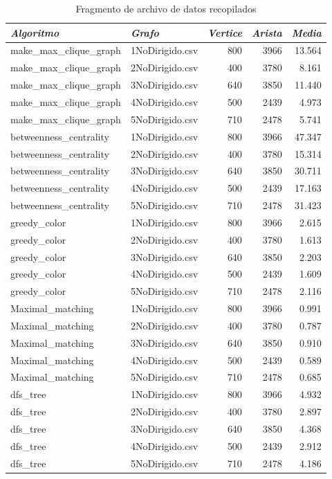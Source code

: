 \documentclass{article}
\begin{document}
\begin{table}[htbp]
  \centering
  \caption{Fragmento de archivo de datos recopilados}
    \begin{tabular}{llrrr}
    \toprule
    \textit{\textbf{Algoritmo}} & \textit{\textbf{Grafo}} & \multicolumn{1}{l}{\textit{\textbf{Vertice}}} & \multicolumn{1}{l}{\textit{\textbf{Arista}}} & \multicolumn{1}{l}{\textit{\textbf{Media}}} \\
    \midrule
    make\_max\_clique\_graph & 1NoDirigido.csv & 800   & 3966  & 13.564 \\
    make\_max\_clique\_graph & 2NoDirigido.csv & 400   & 3780  & 8.161 \\
    make\_max\_clique\_graph & 3NoDirigido.csv & 640   & 3850  & 11.440 \\
    make\_max\_clique\_graph & 4NoDirigido.csv & 500   & 2439  & 4.973 \\
    make\_max\_clique\_graph & 5NoDirigido.csv & 710   & 2478  & 5.741 \\
    betweenness\_centrality & 1NoDirigido.csv & 800   & 3966  & 47.347 \\
    betweenness\_centrality & 2NoDirigido.csv & 400   & 3780  & 15.314 \\
    betweenness\_centrality & 3NoDirigido.csv & 640   & 3850  & 30.711 \\
    betweenness\_centrality & 4NoDirigido.csv & 500   & 2439  & 17.163 \\
    betweenness\_centrality & 5NoDirigido.csv & 710   & 2478  & 31.423 \\
    greedy\_color & 1NoDirigido.csv & 800   & 3966  & 2.615 \\
    greedy\_color & 2NoDirigido.csv & 400   & 3780  & 1.613 \\
    greedy\_color & 3NoDirigido.csv & 640   & 3850  & 2.203 \\
    greedy\_color & 4NoDirigido.csv & 500   & 2439  & 1.609 \\
    greedy\_color & 5NoDirigido.csv & 710   & 2478  & 2.116 \\
    Maximal\_matching & 1NoDirigido.csv & 800   & 3966  & 0.991 \\
    Maximal\_matching & 2NoDirigido.csv & 400   & 3780  & 0.787 \\
    Maximal\_matching & 3NoDirigido.csv & 640   & 3850  & 0.910 \\
    Maximal\_matching & 4NoDirigido.csv & 500   & 2439  & 0.589 \\
    Maximal\_matching & 5NoDirigido.csv & 710   & 2478  & 0.685 \\
    dfs\_tree & 1NoDirigido.csv & 800   & 3966  & 4.932 \\
    dfs\_tree & 2NoDirigido.csv & 400   & 3780  & 2.897 \\
    dfs\_tree & 3NoDirigido.csv & 640   & 3850  & 4.368 \\
    dfs\_tree & 4NoDirigido.csv & 500   & 2439  & 2.912 \\
    dfs\_tree & 5NoDirigido.csv & 710   & 2478  & 4.186 \\
    \bottomrule
    \end{tabular}%
  \label{tab:addlabel}%
\end{table}%
\end{document}
